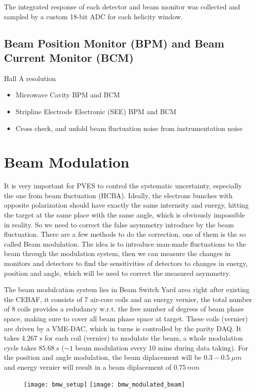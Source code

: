 The integrated response of each detector and beam monitor was collected and sampled 
by a custom 18-bit ADC for each helicity window.
\subsection{Beam Position Monitor (BPM) and Beam Current Monitor (BCM)}
Hall A resolution

\begin{itemize}
    \item Microwave Cavity BPM and BCM
    \item Stripline Electrode Electronic (SEE) BPM and BCM
    \item Cross check, and unfold beam fluctuation noise from instrumentation noise
\end{itemize}

\section{Beam Modulation}
It is very important for PVES to control the systematic uncertainty, especially
the one from beam fluctuation (HCBA). Ideally, the electrons bunches with opposite
polarization should have exactly the same internsity and energy, hitting the target 
at the same place with the same angle, which is obviously impossible in reality. 
So we need to correct the false asymmetry introduce by the beam fluctuation. There are a
few methods to do the correction, one of them is the so called Beam modulation.
The idea is to introduce man-made fluctuations to the beam through the 
modulation system, then we can measure the changes in monitors and detectors 
to find the sensitivities of detectors to changes in energy, position and angle,
which will be used to correct the measured asymmetry.

The beam modulcation system lies in Beam Switch Yard area right after existing 
the CEBAF, it consists of 7 air-core coils and an energy vernier, the total 
number of 8 coils provides a redudancy w.r.t. the free number of degrees 
of beam phase space, making sure to cover all beam phase space at target.  
These coils (vernier) are driven by a VME-DAC, which in turns is controlled by the parity DAQ.
It takes 4.267 s for each coil (vernier) to modulate the beam, a whole 
modulation cycle takes $85.68 \ s$ ($\sim 1$ beam modulation every 10 mins during
data taking). For the position and angle modulation, the beam diplacement will
be $0.3-0.5\ \mu m$ and energy vernier will result in a beam diplacement of $0.75 \ mm$
\begin{figure}[h!]
    \centering
    \texttt{[image: bmw\_setup]}
    \texttt{[image: bmw\_modulated\_beam]}
\end{figure}


